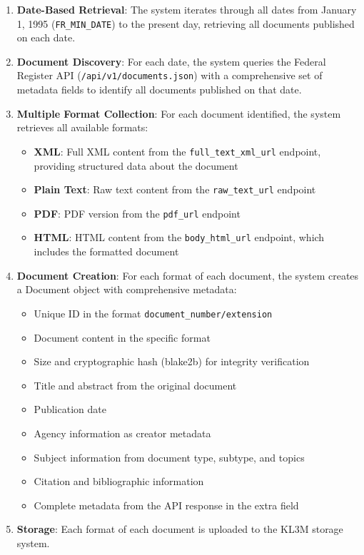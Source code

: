\begin{enumerate}
  \item \textbf{Date-Based Retrieval}: The system iterates through all dates from January 1, 1995 (\texttt{FR\_MIN\_DATE}) to the present day, retrieving all documents published on each date.
  
  \item \textbf{Document Discovery}: For each date, the system queries the Federal Register API (\texttt{/api/v1/documents.json}) with a comprehensive set of metadata fields to identify all documents published on that date.
  
  \item \textbf{Multiple Format Collection}: For each document identified, the system retrieves all available formats:
  \begin{itemize}
    \item \textbf{XML}: Full XML content from the \texttt{full\_text\_xml\_url} endpoint, providing structured data about the document
    \item \textbf{Plain Text}: Raw text content from the \texttt{raw\_text\_url} endpoint
    \item \textbf{PDF}: PDF version from the \texttt{pdf\_url} endpoint
    \item \textbf{HTML}: HTML content from the \texttt{body\_html\_url} endpoint, which includes the formatted document
  \end{itemize}
  
  \item \textbf{Document Creation}: For each format of each document, the system creates a Document object with comprehensive metadata:
  \begin{itemize}
    \item Unique ID in the format \texttt{document\_number/extension}
    \item Document content in the specific format
    \item Size and cryptographic hash (blake2b) for integrity verification
    \item Title and abstract from the original document
    \item Publication date
    \item Agency information as creator metadata
    \item Subject information from document type, subtype, and topics
    \item Citation and bibliographic information
    \item Complete metadata from the API response in the extra field
  \end{itemize}
  
  \item \textbf{Storage}: Each format of each document is uploaded to the KL3M storage system.
\end{enumerate}

